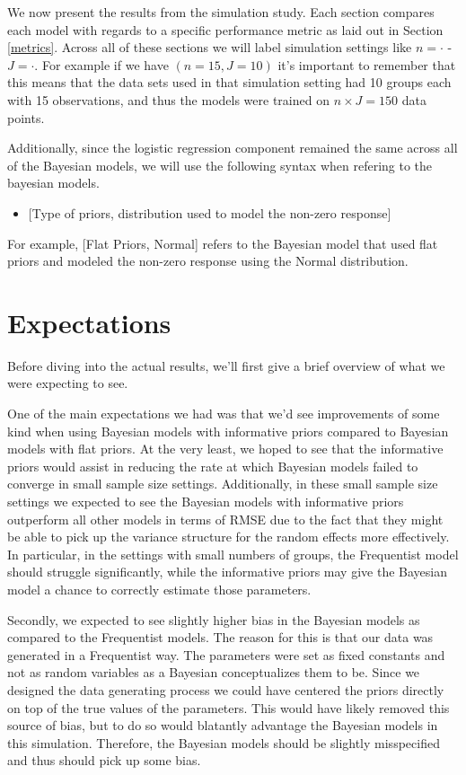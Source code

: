 \documentclass[12pt,twoside]{reedthesis}
\providecommand{\tightlist}{%
  \setlength{\itemsep}{0pt}\setlength{\parskip}{0pt}}
\begin{document}
We now present the results from the simulation study. Each section compares each model with regards to a specific performance metric as laid out in Section \ref{metrics}. Across all of these sections we will label simulation settings like \(n = \cdot\) - \(J = \cdot\). For example if we have \((n = 15, J = 10 )\) it's important to remember that this means that the data sets used in that simulation setting had 10 groups each with 15 observations, and thus the models were trained on \(n\times J = 150\) data points.

Additionally, since the logistic regression component remained the same across all of the Bayesian models, we will use the following syntax when refering to the bayesian models.
\begin{itemize}
\tightlist
\item
  {[}Type of priors, distribution used to model the non-zero response{]}
\end{itemize}
For example, {[}Flat Priors, Normal{]} refers to the Bayesian model that used flat priors and modeled the non-zero response using the Normal distribution.

\hypertarget{expectations}{%
\section{Expectations}\label{expectations}}

Before diving into the actual results, we'll first give a brief overview of what we were expecting to see.

One of the main expectations we had was that we'd see improvements of some kind when using Bayesian models with informative priors compared to Bayesian models with flat priors. At the very least, we hoped to see that the informative priors would assist in reducing the rate at which Bayesian models failed to converge in small sample size settings. Additionally, in these small sample size settings we expected to see the Bayesian models with informative priors outperform all other models in terms of RMSE due to the fact that they might be able to pick up the variance structure for the random effects more effectively. In particular, in the settings with small numbers of groups, the Frequentist model should struggle significantly, while the informative priors may give the Bayesian model a chance to correctly estimate those parameters.

Secondly, we expected to see slightly higher bias in the Bayesian models as compared to the Frequentist models. The reason for this is that our data was generated in a Frequentist way. The parameters were set as fixed constants and not as random variables as a Bayesian conceptualizes them to be. Since we designed the data generating process we could have centered the priors directly on top of the true values of the parameters. This would have likely removed this source of bias, but to do so would blatantly advantage the Bayesian models in this simulation. Therefore, the Bayesian models should be slightly misspecified and thus should pick up some bias.
\end{document}
